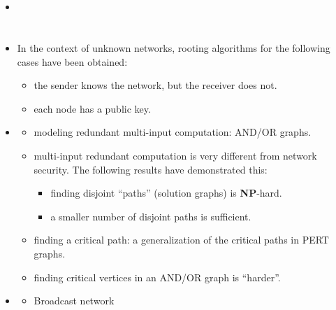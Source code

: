 \documentclass[portrait]{seminar}
\begin{document}
\newpage
\section*{}

\begin{itemize}
\item{}

\end{itemize}


\newpage
\section*{}

\begin{itemize}
\item{}

In the context of unknown networks, rooting algorithms 
for the following cases have been obtained:
\begin{itemize}
\item the sender knows the network, but the receiver does not.
\item each node has a public key.
\end{itemize}

\item{}
\begin{itemize}
\item modeling redundant multi-input computation: AND/OR graphs.
\item multi-input redundant computation is very different 
from network security.  The following results have demonstrated this:
\begin{itemize}
\item finding disjoint ``paths'' (solution graphs) is {\bf NP}-hard.
\item a smaller number of disjoint paths is sufficient. 
\end{itemize}
\item finding a critical path: a generalization of the
critical paths in PERT graphs.
\item finding critical vertices in an AND/OR graph is 
``harder''.
\end{itemize}


\item{}
\begin{itemize}
\item Broadcast network


\end{itemize}
\end{itemize}
\end{document}
